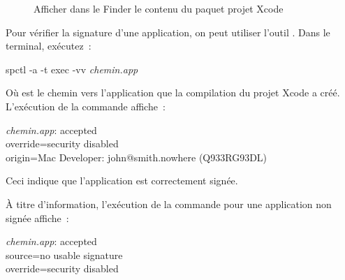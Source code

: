 \begin{figure}[!t]
  \centering
  \hspace{1 cm}
  \caption{Afficher dans le Finder le contenu du paquet projet Xcode}
  \ligne
\end{figure}




Pour vérifier la signature d'une application, on peut utiliser l'outil . Dans le terminal, exécutez~:
\begin{SHELL}
spctl -a -t exec -vv \emph{chemin.app}
\end{SHELL}

Où  est le chemin vers l'application que la compilation du projet Xcode a créé. L'exécution de la commande affiche~:

\begin{SHELL}
\emph{chemin.app}: accepted\\
override=security disabled\\
origin=Mac Developer: john@smith.nowhere (Q933RG93DL)
\end{SHELL}
Ceci indique que l'application est correctement signée.


À titre d'information, l'exécution de la commande pour une application non signée affiche~:
\begin{SHELL}
\emph{chemin.app}: accepted\\
source=no usable signature\\
override=security disabled
\end{SHELL}









